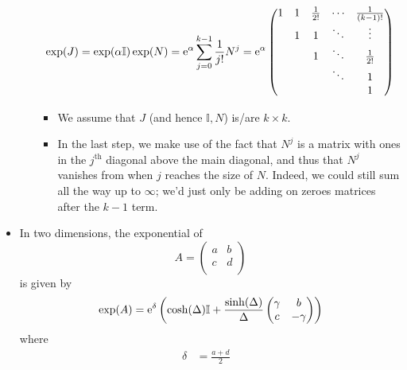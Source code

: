 \documentclass[../notes.tex]{subfiles}
\begin{document}
\begin{itemize}
\begin{itemize}
        \begin{equation*}
            \exp(J) = \exp(\alpha\mathbb{I})\exp(N)
            = \e[\alpha]\sum_{j=0}^{k-1}\frac{1}{j!}N^j
            = \e[\alpha]
            \begin{pmatrix}
                1 & 1 & \frac{1}{2!} & \cdots & \frac{1}{(k-1)!}\\
                 & 1 & 1 & \ddots & \vdots\\
                 &  & 1 & \ddots & \frac{1}{2!}\\
                 &  &  & \ddots & 1\\
                 &  &  &  & 1\\
            \end{pmatrix}
        \end{equation*}
        \begin{itemize}
            \item We assume that $J$ (and hence $\mathbb{I},N$) is/are $k\times k$.
            \item In the last step, we make use of the fact that $N^j$ is a matrix with ones in the $j^\text{th}$ diagonal above the main diagonal, and thus that $N^j$ vanishes from when $j$ reaches the size of $N$. Indeed, we could still sum all the way up to $\infty$; we'd just only be adding on zeroes matrices after the $k-1$ term.
        \end{itemize}
    \end{itemize}
    \item In two dimensions, the exponential of
    \begin{equation*}
        A =
        \begin{pmatrix}
            a & b\\
            c & d\\
        \end{pmatrix}
    \end{equation*}
    is given by
    \begin{equation*}
        \exp(A) = \e[\delta]\left(
            \cosh(\Delta)\mathbb{I}+\frac{\sinh(\Delta)}{\Delta}
            \begin{pmatrix}
                \gamma & b\\
                c & -\gamma\\
            \end{pmatrix}
        \right)
    \end{equation*}
    where
    \begin{align*}
        \delta &= \frac{a+d}{2}&

\end{align*}
\end{itemize}
\end{document}
